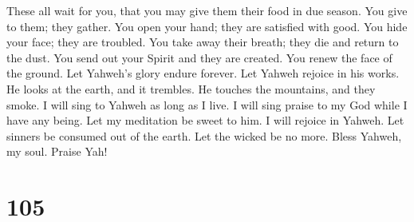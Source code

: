  These all wait for you, that you may give them their
food in due season.  You give to them; they gather. You
open your hand; they are satisfied with good.  You hide
your face; they are troubled. You take away their breath; they die and
return to the dust.  You send out your Spirit and they
are created. You renew the face of the ground.  Let
Yahweh's glory endure forever. Let Yahweh rejoice in his works.
 He looks at the earth, and it trembles. He touches the
mountains, and they smoke.  I will sing to Yahweh as long
as I live. I will sing praise to my God while I have any being.
 Let my meditation be sweet to him. I will rejoice in
Yahweh.  Let sinners be consumed out of the earth. Let
the wicked be no more. Bless Yahweh, my soul. Praise Yah!

\hypertarget{section-104}{%
\section{105}\label{section-104}}

